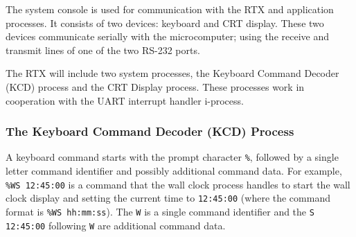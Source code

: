 The system console is used for communication with the RTX and application processes. It consists of two devices: keyboard and CRT display. These two devices communicate serially with the microcomputer; using the receive and transmit lines of one of the two RS-232 ports. 

The RTX will include two system processes, the Keyboard Command Decoder (KCD) process and the CRT Display process. These processes work in cooperation with the UART interrupt handler i-process.

\subsubsection{The Keyboard Command Decoder (KCD) Process}
\label{sec_kcd}
A keyboard command starts with the prompt character \verb+%+, followed by a single letter command identifier and possibly additional command data. For example, \verb+%WS 12:45:00+ is a command that the wall clock process handles to start the wall clock display and setting the current time to \verb+12:45:00+ (where the command format is \verb+%WS hh:mm:ss+). The \verb+W+ is a single command identifier and the \verb+S 12:45:00+ following \verb+W+ are additional command data.

